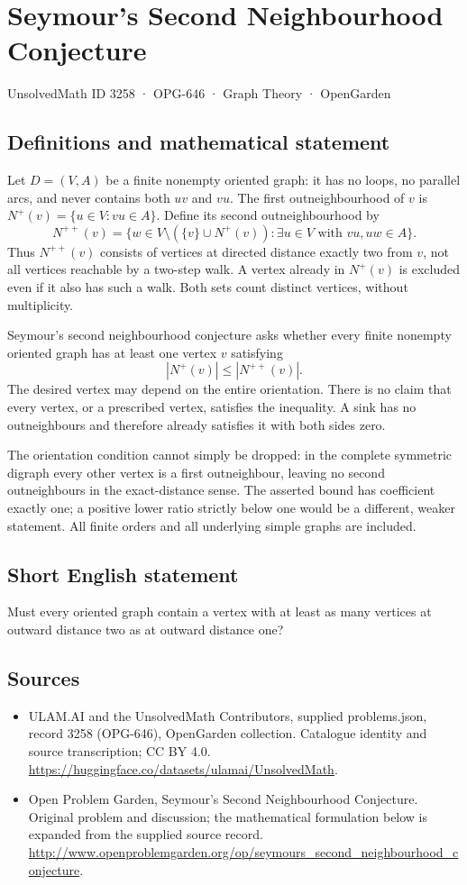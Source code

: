 \documentclass[11pt,a4paper]{article}
\begin{document}
\section*{Seymour's Second Neighbourhood Conjecture}\label{3258}
{\small UnsolvedMath ID 3258 · OPG-646 · Graph Theory · OpenGarden}
\subsection{Definitions and mathematical statement}
Let $D=(V,A)$ be a finite nonempty oriented graph: it has no loops, no
parallel arcs, and never contains both $uv$ and $vu$. The first
outneighbourhood of $v$ is
$N^+(v)=\{u\in V:vu\in A\}$. Define its second outneighbourhood by
\[
 N^{++}(v)=\{w\in V\setminus(\{v\}\cup N^+(v)):
                  \exists u\in V\text{ with }vu,uw\in A\}.
\]
Thus $N^{++}(v)$ consists of vertices at directed distance exactly two
from $v$, not all vertices reachable by a two-step walk. A vertex already
in $N^+(v)$ is excluded even if it also has such a walk. Both sets count
distinct vertices, without multiplicity.

Seymour's second neighbourhood conjecture asks whether every finite
nonempty oriented graph has at least one vertex $v$ satisfying
\[
                       |N^+(v)|\le |N^{++}(v)|.
\]
The desired vertex may depend on the entire orientation. There is no
claim that every vertex, or a prescribed vertex, satisfies the inequality.
A sink has no outneighbours and therefore already satisfies it with
both sides zero.

The orientation condition cannot simply be dropped: in the complete
symmetric digraph every other vertex is a first outneighbour, leaving
no second outneighbours in the exact-distance sense. The asserted bound
has coefficient exactly one; a positive lower ratio strictly below one
would be a different, weaker statement. All finite orders and all
underlying simple graphs are included.
\subsection{Short English statement}
Must every oriented graph contain a vertex with at least as many vertices at outward distance two as at outward distance one?
\subsection{Sources}
\begin{itemize}
\item[S1] ULAM.AI and the UnsolvedMath Contributors, supplied problems.json, record 3258 (OPG-646), OpenGarden collection. Catalogue identity and source transcription; CC BY 4.0.
\url{https://huggingface.co/datasets/ulamai/UnsolvedMath}.
\item[S2] Open Problem Garden, Seymour's Second Neighbourhood Conjecture. Original problem and discussion; the mathematical formulation below is expanded from the supplied source record.
\url{http://www.openproblemgarden.org/op/seymours_second_neighbourhood_conjecture}.
\end{itemize}
\end{document}
